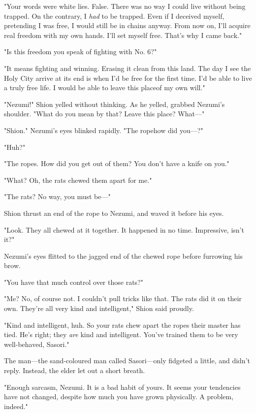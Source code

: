 "Your words were white lies. False. There was no way I could live
without being trapped. On the contrary, I \emph{had} to be trapped. Even if I
deceived myself, pretending I was free, I would still be in chains
anyway. From now on, I'll acquire real freedom with my own hands. I'll
set myself free. That's why I came back."

"Is this freedom you speak of fighting with No. 6?"

"It means fighting and winning. Erasing it clean from this land. The day
I see the Holy City arrive at its end is when I'd be free for the first
time. I'd be able to live a truly free life. I would be able to leave
this place\el of my own will."

"Nezumi!" Shion yelled without thinking. As he yelled, grabbed Nezumi's
shoulder. "What do you mean by that? Leave this place? What---"

"Shion." Nezumi's eyes blinked rapidly. "The rope\el how did you---?"

"Huh?"

"The ropes. How did you get out of them? You don't have a knife on you."

"What? Oh, the rats chewed them apart for me."

"The rats? No way, you must be---"

Shion thrust an end of the rope to Nezumi, and waved it before his eyes.

"Look. They all chewed at it together. It happened in no time.
Impressive, isn't it?"

Nezumi's eyes flitted to the jagged end of the chewed rope before
furrowing his brow.

"You have that much control over those rats?"

"Me? No, of course not. I couldn't pull tricks like that. The rats did
it on their own. They're all very kind and intelligent," Shion said
proudly.

"Kind and intelligent, huh. So your rats chew apart the ropes their
master has tied. He's right; they \emph{are} kind and intelligent. You've
trained them to be very well-behaved, Sasori."

The man---the sand-coloured man called Sasori---only fidgeted a little, and
didn't reply. Instead, the elder let out a short breath.

"Enough sarcasm, Nezumi. It is a bad habit of yours. It seems your
tendencies have not changed, despite how much you have grown physically.
A problem, indeed."

